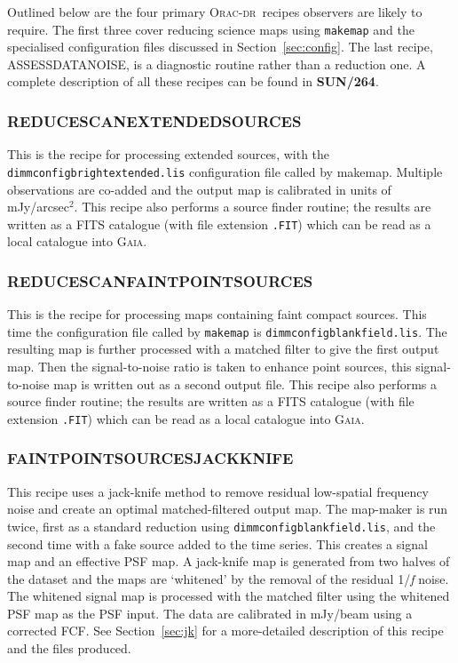 \documentclass[twoside,11pt]{article}
\newcommand{\htmladdnormallink}[2]{#1}
\newcommand{\htmlref}[2]{#1}
\newcommand{\latexhtml}[2]{#1}
\newcommand{\xref}[3]{#1}
\newcommand{\xlabel}[1]{}
\renewcommand{\_}{\texttt{\symbol{95}}}
\newcommand{\gaia}{\xref{\textsc{Gaia}}{sun214}{}}
\newcommand{\oracdr}{\htmladdnormallink{\textsc{Orac-dr}}{http://www.oracdr.org/oracdr}}
\newcommand{\task}[1]{\textsf{#1}}
\newcommand{\makemap}{\xref{\task{makemap}}{sun258}{MAKEMAP}}
\newcommand{\pipelinesun}{\xref{\textbf{SUN/264}}{sun264}{}}
\newcommand{\cref}[3]{\latexhtml{#1~\ref{#2}}{\htmlref{#3}{#2}}}
\begin{document}
Outlined below are the four primary \oracdr\ recipes observers are
likely to require.  The first three cover reducing science maps using
\texttt{makemap} and the specialised configuration files discussed in
\cref{Section}{sec:config}{Specialised configuration files}. The last
recipe, ASSESS\_DATA\_NOISE, is a diagnostic routine rather than a
reduction one. A complete description of all these recipes can be
found in \pipelinesun.


\subsubsection{\xlabel{extsources}REDUCE\_SCAN\_EXTENDED\_SOURCES}

This is the recipe for processing extended sources, with the
\texttt{dimmconfig\_bright\_extended.lis} configuration file called by
\makemap. Multiple observations are co-added and the output
map is calibrated in units of mJy/arcsec$^2$. This recipe also
performs a source finder routine; the results are written as a FITS
catalogue (with file extension \texttt{.FIT}) which can be read as a
local catalogue into \gaia.

\subsubsection{\xlabel{faint}REDUCE\_SCAN\_FAINT\_POINT\_SOURCES}

This is the recipe for processing maps containing faint compact
sources. This time the configuration file called by \texttt{makemap}
is \texttt{dimmconfig\_blank\_field.lis}. The resulting map is further
processed with a matched filter to give the first output map. Then the
signal-to-noise ratio is taken to enhance point sources, this
signal-to-noise map is written out as a second output file. This
recipe also performs a source finder routine; the results are written
as a FITS catalogue (with file extension \texttt{.FIT}) which can be
read as a local catalogue into \gaia.

\subsubsection{\xlabel{faintjk}FAINT\_POINT\_SOURCES\_JACKKNIFE}

This recipe uses a jack-knife method to remove residual low-spatial
frequency noise and create an optimal matched-filtered output map. The
map-maker is run twice, first as a standard reduction using
\texttt{dimmconfig\_blank\_field.lis}, and the second time with a fake
source added to the time series. This creates a signal map and an
effective PSF map. A jack-knife map is generated from two halves of
the dataset and the maps are `whitened' by the removal of the residual
1/\emph{f} noise. The whitened signal map is processed with the
matched filter using the whitened PSF map as the PSF input. The data
are calibrated in mJy/beam using a corrected FCF. See
\cref{Section}{sec:jk}{Example 2 - Advanced pipeline method} for a
more-detailed description of this recipe and the files produced.
\end{document}
